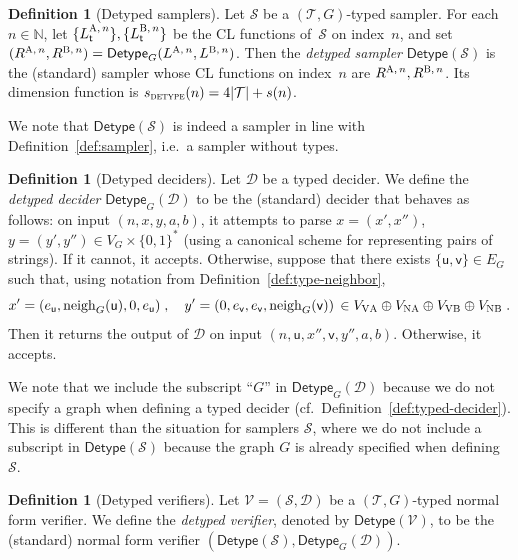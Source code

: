 \documentclass[11pt]{article}
\theoremstyle{definition}
\newtheorem{definition}[theorem]{Definition}
\newcommand{\N}{\ensuremath{\mathbb{N}}}
\newcommand{\sampler}{\mathcal{S}}
\newcommand{\decider}{\mathcal{D}}
\newcommand{\verifier}{\mathcal{V}}
\newcommand{\type}{\mathcal{T}}
\newcommand{\gamestyle}[1]{\ensuremath{\textsc{#1}}\xspace}
\newcommand{\labelstyle}[1]{\ensuremath{\textsc{#1}}\xspace}
\newcommand{\vertex}[1]{\labelstyle{V#1}}
\newcommand{\edge}[1]{\labelstyle{N#1}}
\newcommand{\tvarstyle}[1]{\mathsf{#1}}
\newcommand{\tvar}{\ensuremath{\tvarstyle{t}}}
\newcommand{\lvar}{\ensuremath{\tvarstyle{u}}}
\newcommand{\rvar}{\ensuremath{\tvarstyle{v}}}
\newcommand{\alice}{\labelstyle{A}}
\newcommand{\bob}{\labelstyle{B}}
\newcommand{\tmstyle}[1]{\ensuremath{\mathsf{#1}}}
\newcommand{\detype}{\tmstyle{Detype}}
\begin{document}
\begin{definition}[Detyped samplers]
  Let $\sampler$ be a $(\type,G)$-typed sampler.
  For each $n \in \N$, let $\{L^{\alice,\, n}_\tvar\}, \{L^{\bob,\, n}_\tvar\}$
  be the CL functions of~$\sampler$ on index~$n$, and set
  $(R^{\alice,\, n}, R^{\bob,\, n}) = \detype_G(L^{\alice,\, n}, L^{\bob,\,
    n})$.
  Then the \emph{detyped sampler} $\detype(\sampler)$ is the (standard)
  sampler whose CL functions on index~$n$ are $R^{\alice,\, n}, R^{\bob,\, n}$.
  Its dimension function is $s_{\gamestyle{detype}}(n) = 4|\type|+s(n)$.
\end{definition}

We note that $\detype(\sampler)$ is indeed a sampler in line with Definition~\ref{def:sampler},
i.e.\ a sampler without types.

\begin{definition}[Detyped deciders]
  Let $\decider$ be a typed decider.
  We define the \emph{detyped decider} $\detype_G(\decider)$ to be the
  (standard) decider that behaves as follows: on input $(n,x,y,a,b)$, it
  attempts to parse $x = (x', x'')$, $y =(y', y'') \in V_G \times \{0,1\}^*$
  (using a canonical scheme for representing pairs of strings).
  If it cannot, it accepts.
  Otherwise, suppose that there exists $\{\lvar, \rvar\} \in E_G$ such that,
  using notation from Definition~\ref{def:type-neighbor},
  \begin{equation*}
    x' = (e_\lvar, \mathrm{neigh}_G(\lvar), 0, e_\lvar)\;,\quad
    y' = (0, e_\rvar, e_\rvar, \mathrm{neigh}_G(\rvar))
    \, \in V_{\vertex{\alice}} \oplus V_{\edge{\alice}}
    \oplus V_{\vertex{\bob}} \oplus V_{\edge{\bob}}\;.
  \end{equation*}
  Then it returns the output of $\decider$ on input $(n, \lvar, x'', \rvar, y'',
  a, b)$.
  Otherwise, it accepts.
\end{definition}

We note that we include the subscript ``$G$'' in $\detype_G(\decider)$
because we do not specify a graph when defining a typed decider (cf.\ Definition~\ref{def:typed-decider}).
This is different than the situation for samplers $\sampler$,
where we do not include a subscript in $\detype(\sampler)$
because the graph $G$ is already specified when defining $\sampler$.

\begin{definition}[Detyped verifiers]
\label{def:detyped-verifier}
  Let $\verifier = (\sampler, \decider)$ be a $(\type, G)$-typed normal form
  verifier.
  We define the \emph{detyped verifier}, denoted by $\detype(\verifier)$, to be
  the (standard) normal form verifier
  $(\detype(\sampler), \detype_G(\decider))$.
\end{definition}
\end{document}
